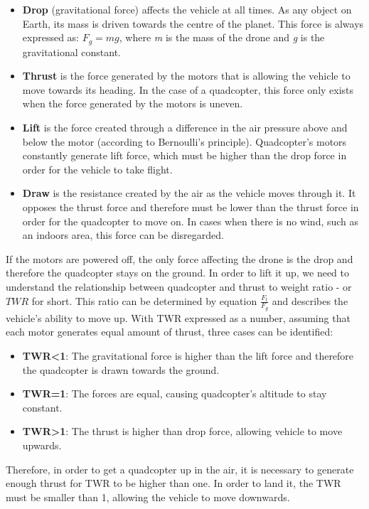 \begin{itemize}
  \item \textbf{Drop} (gravitational force) affects the vehicle at all times. As any object on Earth, its mass is driven towards the centre of the planet. This force is always expressed as: $F_g = mg$, where \textit{m} is the mass of the drone and \textit{g} is the gravitational constant.
  \item \textbf{Thrust} is the force generated by the motors that is allowing the vehicle to move towards its heading. In the case of a quadcopter, this force only exists when the force generated by the motors is uneven.
  \item \textbf{Lift} is the force created through a difference in the air pressure above and below the motor (according to Bernoulli's principle). Quadcopter's motors constantly generate lift force, which must be higher than the drop force in order for the vehicle to take flight.
  \item \textbf{Draw} is the resistance created by the air as the vehicle moves through it. It opposes the thrust force and therefore must be lower than the thrust force in order for the quadcopter to move on. In cases when there is no wind, such as an indoors area, this force can be disregarded.
\end{itemize} 

If the motors are powered off, the only force affecting the drone is the drop and therefore the quadcopter stays on the ground. In order to lift it up, we need to understand the relationship between quadcopter and thrust to weight ratio - or $TWR$ for short. This ratio can be determined by equation $\frac{F_t}{F_g}$ and describes the vehicle's ability to move up. With TWR expressed as a number, assuming that each motor generates equal amount of thrust, three cases can be identified:

\begin{itemize}
\item \textbf{TWR<1}: The gravitational force is higher than the lift force and therefore the quadcopter is drawn towards the ground.
\item \textbf{TWR=1}: The forces are equal, causing quadcopter's altitude to stay constant.
\item \textbf{TWR>1}: The thrust is higher than drop force, allowing vehicle to move upwards.
\end{itemize}

Therefore, in order to get a quadcopter up in the air, it is necessary to generate enough thrust for TWR to be higher than one. In order to land it, the TWR must be smaller than 1, allowing the vehicle to move downwards.

